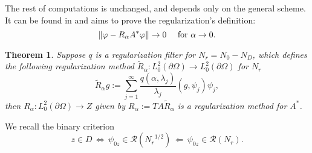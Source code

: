 \documentclass[10pt, a4paper, twoside, openright]{book}
\theoremstyle{definition}
\theoremstyle{plain}
\newtheorem{theorem}[subsection]{Theorem}
\theoremstyle{plain}
\theoremstyle{plain}
\theoremstyle{plain}
\theoremstyle{plain}
\theoremstyle{plain}
\theoremstyle{plain}
\theoremstyle{plain}
\let\phi\varphi
\begin{document}
The rest of computations is unchanged, and depends only on the general scheme. It can be found in \cite{arens:why} and aims to prove the regularization's definition:
\begin{equation}
 \|\phi - R_\alpha A^*\phi\|\to 0 \quad \textup{ for }\alpha\to 0.
\end{equation}
\begin{theorem}
 Suppose $q$ is a regularization filter for ${N_r} = {N_0}- {N_D}$, which defines the following regularization method $\tilde{R}_\alpha : L^2_0(\partial \Omega) \to L^2_0(\partial\Omega)$ for ${N_r}$
 \begin{equation}
  \tilde{R}_\alpha g := \sum_{j=1}^\infty\frac{q(\alpha,\lambda_j)}{\lambda_j}(g,\psi_j)\psi_j,
 \end{equation}
 then $R_\alpha : L^2_0(\partial\Omega) \to Z$  given by $R_\alpha:=TA\tilde{R}_\alpha$ is a regularization method for $A^*$.
\end{theorem}
We recall the binary criterion
\begin{equation}
 z\in D \,\Longleftrightarrow \, \psi_{0z}\in\mathcal{R}({N_r}^{1/2})\, \Longleftarrow \,\psi_{0z}\in\mathcal{R}({N_r}).
\end{equation}
\end{document}
